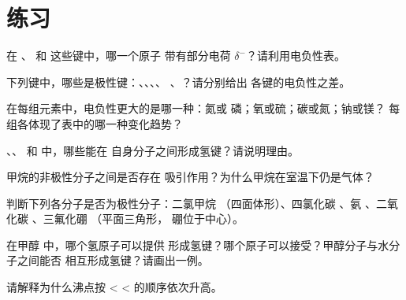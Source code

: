 \section{练习}


\begin{exercise}[$\star$]\label{exo:g11:polarity-and-cohesion:1}
在 、 和  这些键中，哪一个原子
带有部分电荷 $\delta^-$？请利用电负性表。
\end{exercise}

\begin{exercise}[$\star$]\label{exo:g11:polarity-and-cohesion:2}
下列键中，哪些是极性键：、、、、
、？请分别给出
各键的电负性之差。
\end{exercise}

\begin{exercise}[$\star$]\label{exo:g11:polarity-and-cohesion:3}
在每组元素中，电负性更大的是哪一种：氮或
磷；氧或硫；碳或氮；钠或镁？
每组各体现了表中的哪一种变化趋势？
\end{exercise}

\begin{exercise}[$\star$]\label{exo:g11:polarity-and-cohesion:4}
、、 和  中，哪些能在
自身分子之间形成氢键？请说明理由。
\end{exercise}

\begin{exercise}[$\star$]\label{exo:g11:polarity-and-cohesion:5}
甲烷的非极性分子之间是否存在
吸引作用？为什么甲烷在室温下仍是气体？
\end{exercise}

\begin{exercise}[$\star\star$]\label{exo:g11:polarity-and-cohesion:6}
判断下列各分子是否为极性分子：二氯甲烷 
（四面体形）、四氯化碳 、氨 、二氧
化碳 、三氟化硼 （平面三角形，
硼位于中心）。
\end{exercise}

\begin{exercise}[$\star\star$]\label{exo:g11:polarity-and-cohesion:7}
在甲醇  中，哪个氢原子可以提供
形成氢键？哪个原子可以接受？甲醇分子与水分子之间能否
相互形成氢键？请画出一例。
\end{exercise}

\begin{exercise}[$\star\star$]\label{exo:g11:polarity-and-cohesion:8}
请解释为什么沸点按  <
 <  的顺序依次升高。
\end{exercise}

